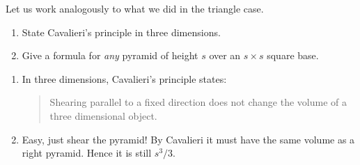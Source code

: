 \documentclass[nooutcomes,noauthor,handout,hints]{ximera}
\begin{document}
\begin{question}
  Let us work analogously to what we did in the triangle case.
  \begin{enumerate}
  \item State Cavalieri's principle in three dimensions.
  \item Give a formula for \emph{any} pyramid of height $s$ over an $s\times
    s$ square base.
  \end{enumerate}
    \begin{freeResponse}
      \begin{enumerate}
      \item In three dimensions, Cavalieri's principle states:
        \begin{quote}
          Shearing parallel to a fixed direction does not change the
          volume of a three dimensional object.
        \end{quote}
      \item Easy, just shear the pyramid! By Cavalieri it must have
        the same volume as a right pyramid. Hence it is still $s^3/3$.
      \end{enumerate}
    \end{freeResponse}
\end{question}
\end{document}
